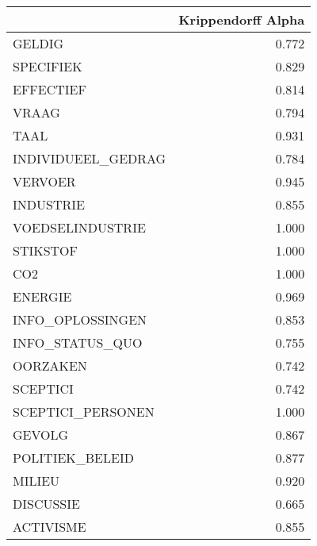 \begin{tabular}{lr}
\toprule
{} &  Krippendorff Alpha \\
\midrule
GELDIG             &               0.772 \\
SPECIFIEK          &               0.829 \\
EFFECTIEF          &               0.814 \\
VRAAG              &               0.794 \\
TAAL               &               0.931 \\
INDIVIDUEEL\_GEDRAG &               0.784 \\
VERVOER            &               0.945 \\
INDUSTRIE          &               0.855 \\
VOEDSELINDUSTRIE   &               1.000 \\
STIKSTOF           &               1.000 \\
CO2                &               1.000 \\
ENERGIE            &               0.969 \\
INFO\_OPLOSSINGEN   &               0.853 \\
INFO\_STATUS\_QUO    &               0.755 \\
OORZAKEN           &               0.742 \\
SCEPTICI           &               0.742 \\
SCEPTICI\_PERSONEN  &               1.000 \\
GEVOLG             &               0.867 \\
POLITIEK\_BELEID    &               0.877 \\
MILIEU             &               0.920 \\
DISCUSSIE          &               0.665 \\
ACTIVISME          &               0.855 \\
\bottomrule
\end{tabular}
